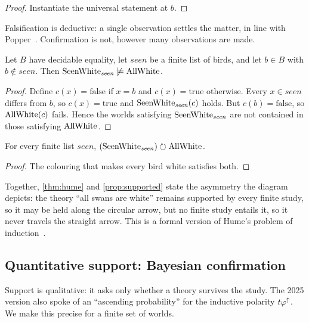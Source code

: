 \begin{proof}
Instantiate the universal statement at $b$.
\end{proof}

Falsification is deductive: a single observation settles the matter, in line with
Popper~\cite{popper}. Confirmation is not, however many observations are made.

\begin{theorem}\label{thm:hume}
Let $B$ have decidable equality, let $\mathit{seen}$ be a finite list of birds, and let
$b\in B$ with $b\notin\mathit{seen}$. Then $\mathrm{SeenWhite}_{\mathit{seen}}\not\models\mathrm{AllWhite}$.
\end{theorem}

\begin{proof}
Define $c(x)=\mathrm{false}$ if $x=b$ and $c(x)=\mathrm{true}$ otherwise. Every $x\in\mathit{seen}$
differs from $b$, so $c(x)=\mathrm{true}$ and $\mathrm{SeenWhite}_{\mathit{seen}}(c)$ holds. But
$c(b)=\mathrm{false}$, so $\mathrm{AllWhite}(c)$ fails. Hence the worlds satisfying
$\mathrm{SeenWhite}_{\mathit{seen}}$ are not contained in those satisfying $\mathrm{AllWhite}$.
\end{proof}

\begin{proposition}\label{prop:supported}
For every finite list $\mathit{seen}$, $(\mathrm{SeenWhite}_{\mathit{seen}})\circlearrowright\mathrm{AllWhite}$.
\end{proposition}

\begin{proof}
The colouring that makes every bird white satisfies both.
\end{proof}

Together, \cref{thm:hume} and \cref{prop:supported} state the asymmetry the diagram depicts:
the theory ``all swans are white'' remains supported by every finite study, so it may be held along
the circular arrow, but no finite study entails it, so it never travels the straight arrow. This is
a formal version of Hume's problem of induction~\cite{hume}.

\subsection{Quantitative support: Bayesian confirmation}\label{sec:confirmation}

Support is qualitative: it asks only whether a theory survives the study. The 2025 version also
spoke of an ``ascending probability'' for the inductive polarity $t\varphi^{{\uparrow}}$. We make this
precise for a finite set of worlds.

